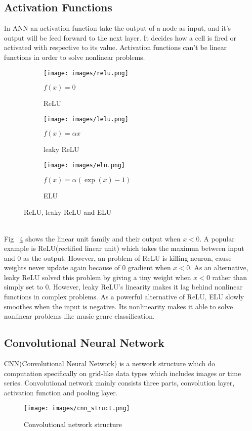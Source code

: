 \documentclass[a4paper, 11pt]{report}
\begin{document}
\subsection{Activation Functions}
In ANN an activation function take the output of a node as input, and it's output will be feed forward to the next layer. It decides how a cell is fired or activated with respective to its value. Activation functions can't be linear functions in order to solve nonlinear problems. 
\begin{figure}[h]
\begin{subfigure}{.33\textwidth}
  \centering
  \texttt{[image: images/relu.png]}
  \caption{ReLU}
  \label{fig:relu}
  {$f(x)=0$}
\end{subfigure}%
\begin{subfigure}{.34\textwidth}
  \centering
  \texttt{[image: images/lelu.png]}
  \caption{leaky ReLU}
  {$f(x)=\alpha x$}
  \label{fig:lelu}
\end{subfigure}%
\begin{subfigure}{.33\textwidth}
  \centering
  \texttt{[image: images/elu.png]}
  \caption{ELU}
  {$f(x)=\alpha(\exp (x)-1)$}
  \label{fig:elu}
\end{subfigure}
\caption{ReLU, leaky ReLU and ELU}
\label{fig:reluelu}
\end{figure}\\
Fig ~\ref{fig:reluelu} shows the linear unit family and their output when $x<0$. A popular example is ReLU(rectified linear unit) which takes the maximun between input and 0 as the output. However, an problem of ReLU is killing neuron, cause weights never update again because of 0 gradient when $x<0$. As an alternative, leaky ReLU solved this problem by giving a tiny weight when $x<0$ rather than simply set to 0. However, leaky ReLU's linearity makes it lag behind nonlinear functions in complex problems. As a powerful alternative of ReLU, ELU slowly smoothes when the input is negative. Its nonlinearity makes it able to solve nonlinear problems like music genre classification.
\subsection{Convolutional Neural Network}
CNN(Convolutional Neural Network) is a network structure which do computation specifically on grid-like data types which includes images or time series. Convolutional network mainly consists three parts, convolution layer, activation function and pooling layer.
\begin{figure}[h]
 	\caption{Convolutional network structure \protect{}}
 	\centering
 	\texttt{[image: images/cnn\_struct.png]}
 	\label{fig:cnn_struct}
 \end{figure}\\
\end{document}

